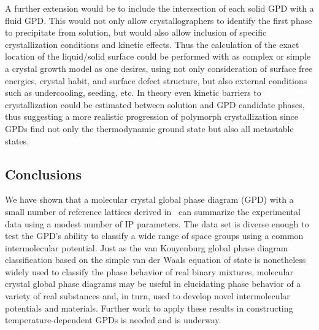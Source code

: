 \documentclass[preprint]{iucr}              %
\newcommand{\mb}[1]{\ensuremath{\mbox{\boldmath $ #1 $}}}
\begin{document}
A further extension would be to include the intersection of each
solid GPD with a fluid GPD.  This would not only allow
crystallographers to identify the first phase to precipitate from
solution, but would also allow inclusion of specific crystallization conditions
and kinetic effects. Thus the calculation of the exact location of the
liquid/solid surface could be performed with as complex or simple a crystal
growth model as one desires, using not only consideration of surface free
energies, crystal habit, and surface defect structure, but also external conditions such as
undercooling, seeding, etc.  In theory even kinetic barriers to crystallization
could be estimated between solution and GPD candidate phases, thus
suggesting a more realistic progression of polymorph crystallization
since GPDs find not only the thermodynamic ground state but also all metastable states.



\subsection{Conclusions}

We have shown that a molecular crystal global phase diagram (GPD)
with a small number of reference lattices derived
in~\cite{McClurg09} can summarize the experimental data using a
modest number of IP parameters. The data set is diverse enough to
test the GPD's ability to classify a wide range of space groups
using a common intermolecular potential. Just as the van Konyenburg
global phase diagram classification based on the simple van der
Waals equation of state is nonetheless widely used to classify the
phase behavior of real binary mixtures, molecular crystal global
phase diagrams may be useful in elucidating phase behavior of a
variety of real substances and, in turn, used to develop novel
intermolecular potentials and materials. Further work to apply these results in constructing
temperature-dependent GPDs is needed and is underway. 

\end{document}
